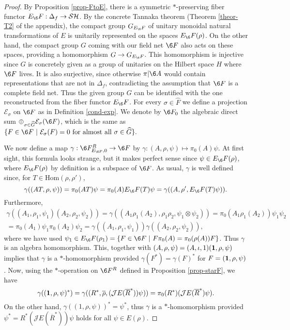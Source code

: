 \documentclass[11pt]{article}
\theoremstyle{definition}
\theoremstyle{definition}
\theoremstyle{remark}
\def\2#1{{\mathcal #1}}
\def\1#1{{\bf #1}}
\def\ol#1{{\overline #1}}
\newcommand{\Hom}{\mathrm{Hom}}
\newcommand{\rarr}{\rightarrow}
\begin{document}
\begin{proof} By Proposition \ref{prop-FtoE}, there is
  a symmetric $*$-preserving fiber functor
  $E_\6F:\Delta_f\rarr\2S\2H$. By the concrete Tannaka
  theorem (Theorem \ref{theor-T2} of the appendix), the
  compact group $G_{E_\6F}$ of unitary monoidal natural
  transformations of $E$ is unitarily represented on
  the spaces $E_\6F(\rho)$. On the other hand, the
  compact group $G$ coming with our field net $\6F$
  also acts on these spaces, providing a homomorphism
  $G\rarr G_{E_\6F}$. This homomorphism is injective
  since $G$ is concretely given as a group of unitaries
  on the Hilbert space $H$ where $\6F$ lives. It is
  also surjective, since otherwise $\pi|\6A$ would
  contain representations that are not in $\Delta_f$,
  contradicting the assumption that $\6F$ is a complete
  field net. Thus the given group $G$ can be identified
  with the one reconstructed from the fiber functor
  $E_\6F$. For every $\sigma\in\widehat{F}$ we define a
  projection $\2E_\sigma$ on $\6F$ as in Definition
  \ref{cond-exp}. We denote by $\6F_0$ the algebraic
  direct sum
  $\oplus_{\sigma\in\widehat{G}}\2E_\sigma(\6F)$, which
  is the same as $\{ F\in\6F\ | \ \2E_\sigma(F)=0\
  \mbox{for almost all}\ \sigma\in\widehat{G}\}.$

We now define a map $\gamma:\6F^R_{E_{\6F},0}\rarr\6F$ by 
$\gamma:(A,\rho,\psi)\mapsto\pi_0(A)\psi$. At first sight, this formula looks strange, but it makes
perfect sense since $\psi\in E_\6F(\rho)$, where $E_\6F(\rho)$ by definition is a subspace of $\6F$.
As usual, $\gamma$ is well defined since, for $T\in\Hom(\rho,\rho')$,
\[ \gamma((AT,\rho,\psi))=\pi_0(AT)\psi=\pi_0(A)E_\6F(T)\psi   =\gamma((A,\rho',E_\6F(T)\psi)). \]
Furthermore,
\begin{multline*}  \gamma((A_1,\rho_1,\psi_1)(A_2,\rho_2,\psi_2)) =
  \gamma((A_1\rho_1(A_2),\rho_1\rho_2,\psi_1\otimes\psi_2)) 
   =\pi_0(A_1\rho_1(A_2))\psi_1\psi_2  \\ 
    = \pi_0(A_1)\psi_1\pi_0(A_2)\psi_2 
   = \gamma((A_1,\rho_1,\psi_1))\gamma((A_2,\rho_2,\psi_2)), 
\end{multline*}
where we have used $\psi_1\in E_\6F(\rho_1)=\{F\in\6F\ | \ F\pi_0(A)=\pi_0(\rho(A))F\}$. Thus
$\gamma$ is an algebra homomorphism. This, together with $(A,\rho,\psi)=(A,\iota,1)(\11,\rho,\psi)$
implies that $\gamma$ is a $*$-homomorphism provided $\gamma(F^*)=\gamma(F)^*$ for
$F=(\11,\rho,\psi)$. Now, using the $*$-operation on $\6F^R$ defined in Proposition
\ref{prop-starF}, we have 
\[ \gamma((\11,\rho,\psi)^*)=\gamma((R^*,\ol\rho,(\2JE(\overline{R}^*))\psi))
  = \pi_0(R^*)(\2JE(\overline{R}^*)\psi). \]
On the other hand, $\gamma((1,\rho,\psi))^*=\psi^*$, thus $\gamma$ is a $*$-homomorphism provided 
$\psi^*=R^*(\2JE(\overline{R}^*))\psi$ holds for all $\psi\in E(\rho)$.


\end{proof}
\end{document}
